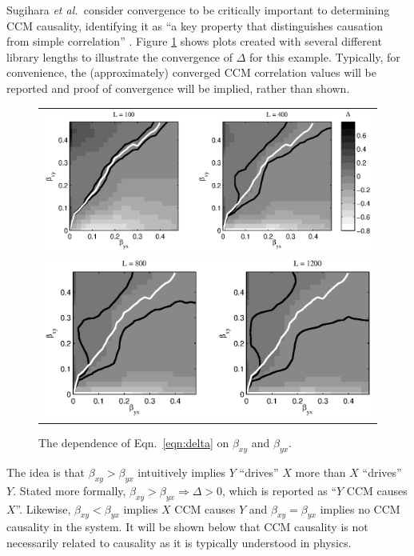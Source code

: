 \documentclass[twocolumn,aps,pre,groupedaddress]{revtex4-1}
\begin{document}
Sugihara {\em et al.\ }consider convergence to be critically important to determining CCM causality, identifying it as ``a key property that distinguishes causation from simple correlation'' \cite{Sugihara2012}.  Figure \ref{fig:BGridPlot} shows plots created with several different library lengths to illustrate the convergence of $\Delta$ for this example.  Typically, for convenience, the (approximately) converged CCM correlation values will be reported and proof of convergence will be implied, rather than shown.
\begin{figure}[ht]
\begin{tabular}{l}
\includegraphics[scale=0.5]{Figure1A.eps}\\
\includegraphics[scale=0.5]{Figure1B.eps}
\end{tabular}
\caption{The dependence of Eqn.\ \ref{eqn:delta} on $\beta_{xy}$ and $\beta_{yx}$.}
\label{fig:BGridPlot}
\end{figure}

The idea is that $\beta_{xy}>\beta_{yx}$ intuitively implies $Y$ ``drives'' $X$ more than $X$ ``drives'' $Y$.  Stated more formally, $\beta_{xy}>\beta_{yx}\Rightarrow\Delta>0$, which is reported as ``$Y$ CCM causes $X$''.  Likewise, $\beta_{xy}<\beta_{yx}$ implies $X$ CCM causes $Y$ and $\beta_{xy}=\beta_{yx}$ implies no CCM causality in the system.  It will be shown below that CCM causality is not necessarily related to causality as it is typically understood in physics.
\end{document}
